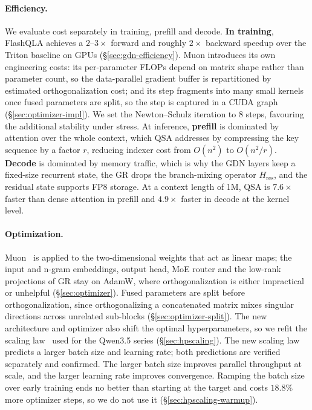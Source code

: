 \paragraph{Efficiency.}
We evaluate cost separately in training, prefill and decode. \textbf{In training}, FlashQLA achieves a $2$--$3\times$ forward and roughly $2\times$ backward speedup over the Triton baseline on GPUs (\S\ref{sec:gdn-efficiency}). 
Muon introduces its own engineering costs: its per-parameter FLOPs depend on matrix shape rather than parameter count, so
the data-parallel gradient buffer is repartitioned by estimated orthogonalization cost; and its step fragments into many small kernels once fused parameters are split, so the step is captured in a CUDA graph (\S\ref{sec:optimizer-impl}).
We set the Newton--Schulz iteration to 8 steps, favouring the additional stability under stress. 
At inference, \textbf{prefill} is dominated by attention over the whole context, which QSA addresses by compressing the key sequence by a factor $r$, reducing indexer cost from $O(n^2)$ to $O(n^2/r)$. 
\textbf{Decode} is dominated by memory traffic, which is why the GDN layers keep a fixed-size recurrent state, the GR drops the branch-mixing operator $H_{\mathrm{res}}$, and the
residual state supports FP8 storage. 
At a context length of 1M, QSA is $7.6\times$ faster than dense attention in prefill and $4.9\times$ faster in decode at the kernel level.

\paragraph{Optimization.}
Muon~\citep{jordan2024muon} is applied to the two-dimensional weights that act as linear maps; the input and n-gram embeddings, output head, MoE router and the
low-rank projections of GR stay on AdamW, where orthogonalization is either
impractical or unhelpful (\S\ref{sec:optimizer}). 
Fused parameters are split before orthogonalization, since orthogonalizing a concatenated matrix mixes
singular directions across unrelated sub-blocks
(\S\ref{sec:optimizer-split}). 
The new architecture and optimizer also shift
the optimal hyperparameters, so we refit the scaling
law~\citep{kaplan2020scaling} used for the Qwen3.5 series
(\S\ref{sec:hpscaling}).
The new scaling law predicts a larger batch size and learning rate; both predictions are verified separately and confirmed. 
The larger batch size improves parallel throughput at scale, and the larger learning rate improves convergence. 
Ramping the batch size over early training ends no better than starting at the target and costs $18.8\%$ more optimizer steps, so we do not use it (\S\ref{sec:hpscaling-warmup}).


